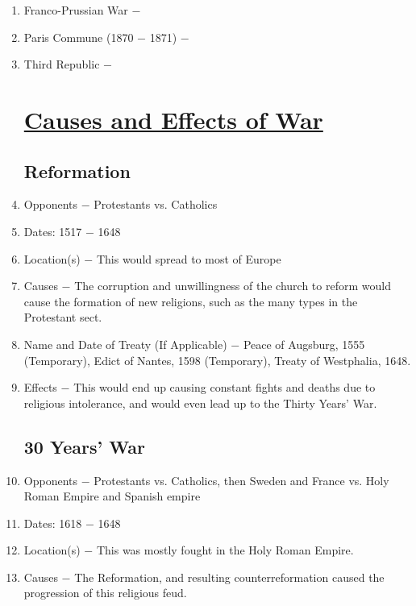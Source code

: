 \documentclass[12pt]{article}
\begin{document}
\begin{enumerate}
\item Franco-Prussian War $-$

\item Paris Commune (1870 $-$ 1871) $-$ 

\item Third Republic $-$


\section{\underline{Causes and Effects of War}}

\subsection{Reformation} 

\item Opponents $-$ Protestants vs. Catholics

\item Dates: 1517 $-$ 1648

\item Location(s) $-$ This would spread to most of Europe

\item Causes $-$ The corruption and unwillingness of the church to reform would cause the formation of new religions, such as the many types in the Protestant sect.

\item Name and Date of Treaty (If Applicable) $-$ Peace of Augsburg, 1555 (Temporary), Edict of Nantes, 1598 (Temporary), Treaty of Westphalia, 1648.

\item Effects $-$ This would end up causing constant fights and deaths due to religious intolerance, and would even lead up to the Thirty Years' War.

\subsection{30 Years' War}

\item Opponents $-$ Protestants vs. Catholics, then Sweden and France vs. Holy Roman Empire and Spanish empire 

\item Dates: 1618 $-$ 1648

\item Location(s) $-$ This was mostly fought in the Holy Roman Empire.

\item Causes $-$ The Reformation, and resulting counterreformation caused the progression of this religious feud.


\end{enumerate}
\end{document}
